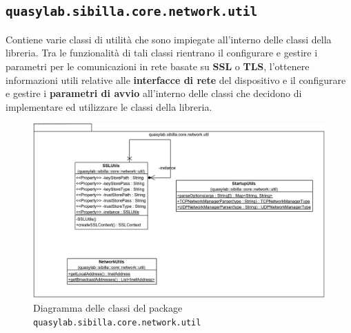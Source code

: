 \subsection{\texttt{quasylab.sibilla.core.network.util}} Contiene varie classi di utilità che sono impiegate all’interno delle classi della libreria. Tra le funzionalità di tali classi rientrano il configurare e gestire i parametri per le comunicazioni in rete basate su \textbf{SSL} o \textbf{TLS}, l’ottenere informazioni utili relative alle \textbf{interfacce di rete} del dispositivo e il configurare e gestire i \textbf{parametri di avvio} all’interno delle classi che decidono di implementare ed utilizzare le classi della libreria.

\begin{figure}[H]
    \includegraphics[width=\linewidth]{images/quasylab.sibilla.core.network.util.png}
    \captionsetup{justification=centering}
    \caption{Diagramma delle classi del package \texttt{quasylab.sibilla.core.network.util}}
  \end{figure}













